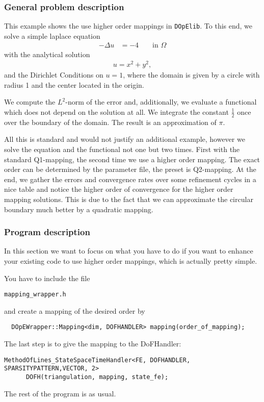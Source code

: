 \subsubsection{General problem description}
This example shows the use higher order mappings in \texttt{DOpElib}. To this end, we solve a simple laplace equation
\begin{align*}
-\Delta u &= -4 && \text{ in } \Omega
\end{align*}
with the analytical solution
\begin{align*}
u = {x^2 + y^2},
\end{align*}
and the Dirichlet Conditions on $u=1$, where the domain is given by a circle with radius 1 and the center located in the origin.

We compute the $L^2$-norm of the error and, additionally, we evaluate a functional which does not depend on the solution at all.
We integrate the constant $\frac 12$ once over the boundary of the domain. The result is an approximation of $\pi$.

All this is standard and would not justify an additional example, however we solve the equation and the functional not one but two
times. First with the standard Q1-mapping, the second time we use a higher order mapping. The exact order can be determined by the 
parameter file, the preset is Q2-mapping. At the end, we gather the errors and convergence rates over some refinement cycles
in a nice table and notice the higher order of convergence for the higher order mapping solutions. This is due to the fact that
we can approximate the circular boundary much better by a quadratic mapping.
\subsubsection{Program description}
In this section we want to focus on what you have to do if you want to enhance your existing code to use higher order mappings,
which is actually pretty simple.

You have to include the file
\begin{verbatim}
mapping_wrapper.h
\end{verbatim}

and create a mapping of the desired order by
\begin{verbatim}
  DOpEWrapper::Mapping<dim, DOFHANDLER> mapping(order_of_mapping);
\end{verbatim}

The last step is to give the mapping to the DoFHandler:
\begin{verbatim}
MethodOfLines_StateSpaceTimeHandler<FE, DOFHANDLER, SPARSITYPATTERN,VECTOR, 2> 
	  DOFH(triangulation, mapping, state_fe);
\end{verbatim}
The rest of the program is as usual.
